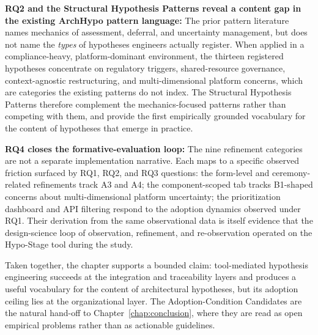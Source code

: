 \textbf{RQ2 and the Structural Hypothesis Patterns reveal a content gap in the
existing ArchHypo pattern language:} The prior pattern literature
\citep{silva2024patterns, silva2023initialpatterns} names mechanics of
assessment, deferral, and uncertainty management, but does not name the
\emph{types} of hypotheses engineers actually register. When applied in a
compliance-heavy, platform-dominant environment, the thirteen registered
hypotheses concentrate on regulatory triggers, shared-resource governance,
context-agnostic restructuring, and multi-dimensional platform concerns, which are categories the
existing patterns do not index. The Structural Hypothesis Patterns therefore
complement the mechanics-focused patterns rather than competing with them, and provide
the first empirically grounded vocabulary for the content of hypotheses
that emerge in practice.

\textbf{RQ4 closes the formative-evaluation loop:} The nine refinement
categories are not a separate implementation narrative. Each maps to a
specific observed friction surfaced by RQ1, RQ2, and RQ3 questions: the form-level and
ceremony-related refinements track A3 and A4; the component-scoped tab
tracks B1-shaped concerns about multi-dimensional platform uncertainty; the
prioritization dashboard and API filtering respond to the adoption
dynamics observed under RQ1. Their derivation from the same observational
data is itself evidence that the design-science loop of observation,
refinement, and re-observation operated on the Hypo-Stage tool during the study.

Taken together, the chapter supports a bounded claim: tool-mediated
hypothesis engineering succeeds at the integration and traceability layers
and produces a useful vocabulary for the content of architectural
hypotheses, but its adoption ceiling lies at the organizational layer. The
Adoption-Condition Candidates are the natural hand-off to
Chapter~\ref{chap:conclusion}, where they are read as open empirical problems rather than as actionable guidelines.
